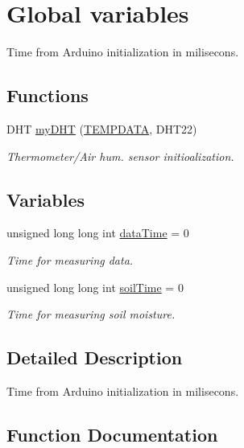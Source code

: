 \hypertarget{group__vars}{}\section{Global variables}
\label{group__vars}


Time from Arduino initialization in milisecons.  


\subsection*{Functions}
\begin{DoxyCompactItemize}
\item 
D\+HT \hyperlink{group__vars_gad6792c9d57a95299da095bfc059e14b3}{my\+D\+HT} (\hyperlink{group__const_gad85c50d1f6e8fb6bba261da3691fcb3f}{T\+E\+M\+P\+D\+A\+TA}, D\+H\+T22)
\begin{DoxyCompactList}\small\item\em Thermometer/\+Air hum. sensor initioalization. \end{DoxyCompactList}\end{DoxyCompactItemize}
\subsection*{Variables}
\begin{DoxyCompactItemize}
\item 
unsigned long long int \hyperlink{group__vars_ga8739a36f1280d74b0cdf25a29769cec3}{data\+Time} = 0
\begin{DoxyCompactList}\small\item\em Time for measuring data. \end{DoxyCompactList}\item 
unsigned long long int \hyperlink{group__vars_ga15bdfe0582d8b5793a6c31b9b1b7a4a1}{soil\+Time} = 0
\begin{DoxyCompactList}\small\item\em Time for measuring soil moisture. \end{DoxyCompactList}\end{DoxyCompactItemize}


\subsection{Detailed Description}
Time from Arduino initialization in milisecons. 



\subsection{Function Documentation}
